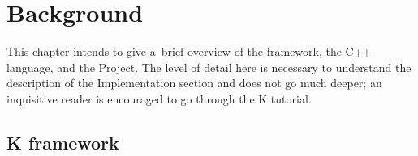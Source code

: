 \documentclass{fithesis3}
\newcommand{\Project}{Project\xspace}
\begin{document}



\chapter{Background}
This chapter intends to give a~brief overview of the \K framework, the C++ language, and the \Project.
The level of detail here is necessary to understand the description of the Implementation section and does not go much deeper; an inquisitive reader is encouraged to go through the K tutorial. %

\section{K framework}

%
%
%
%
%
%




\end{document}

